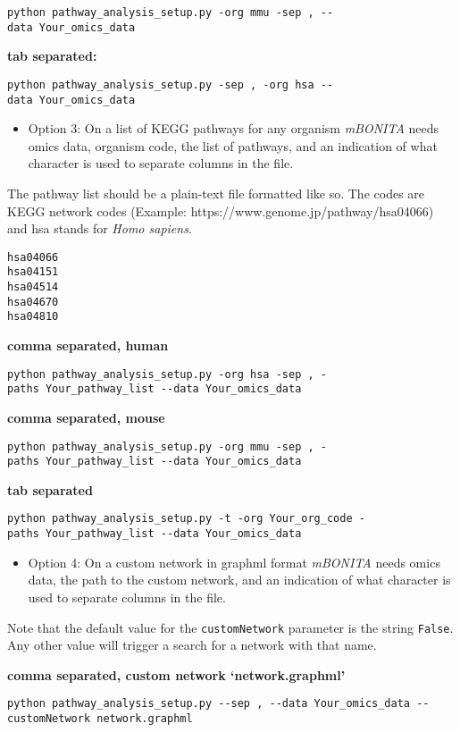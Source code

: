 \documentclass[]{article}
\providecommand{\tightlist}{%
  \setlength{\itemsep}{0pt}\setlength{\parskip}{0pt}}
\begin{document}
\texttt{python\ pathway\_analysis\_setup.py\ -org\ mmu\ -sep\ ,\ -\/-data\ Your\_omics\_data}

\textbf{tab separated:}

\texttt{python\ pathway\_analysis\_setup.py\ -sep\ ,\ -org\ hsa\ -\/-data\ Your\_omics\_data}

\begin{itemize}
\tightlist
\item
  Option 3: On a list of KEGG pathways for any organism \emph{mBONITA}
  needs omics data, organism code, the list of pathways, and an
  indication of what character is used to separate columns in the file.
\end{itemize}

The pathway list should be a plain-text file formatted like so. The
codes are KEGG network codes (Example:
https://www.genome.jp/pathway/hsa04066) and hsa stands for \emph{Homo
sapiens}.

\begin{verbatim}
hsa04066
hsa04151
hsa04514
hsa04670
hsa04810
\end{verbatim}

\textbf{comma separated, human}

\texttt{python\ pathway\_analysis\_setup.py\ -org\ hsa\ -sep\ ,\ -paths\ Your\_pathway\_list\ -\/-data\ Your\_omics\_data}

\textbf{comma separated, mouse}

\texttt{python\ pathway\_analysis\_setup.py\ -org\ mmu\ -sep\ ,\ -paths\ Your\_pathway\_list\ -\/-data\ Your\_omics\_data}

\textbf{tab separated}

\texttt{python\ pathway\_analysis\_setup.py\ -t\ -org\ Your\_org\_code\ -paths\ Your\_pathway\_list\ -\/-data\ Your\_omics\_data}

\begin{itemize}
\tightlist
\item
  Option 4: On a custom network in graphml format \emph{mBONITA} needs
  omics data, the path to the custom network, and an indication of what
  character is used to separate columns in the file.
\end{itemize}

Note that the default value for the \texttt{customNetwork} parameter is
the string \texttt{False}. Any other value will trigger a search for a
network with that name.

\textbf{comma separated, custom network `network.graphml'}

\texttt{python\ pathway\_analysis\_setup.py\ -\/-sep\ ,\ -\/-data\ Your\_omics\_data\ -\/-customNetwork\ network.graphml}
\end{document}
